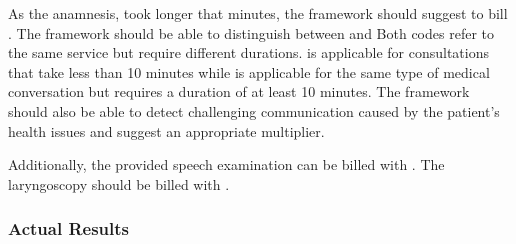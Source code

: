 As the anamnesis, took longer that  minutes, the framework should suggest to bill .
The framework should be able to distinguish between  and 
Both codes refer to the same service but require different durations.
 is applicable for consultations that take less than 10 minutes while  is applicable for the same type of medical conversation but requires a duration of at least 10 minutes.
The framework should also be able to detect challenging communication caused by the patient's health issues and suggest an appropriate multiplier.

Additionally, the provided speech examination can be billed with .
The laryngoscopy should be billed with .

\subsubsection{Actual Results}

